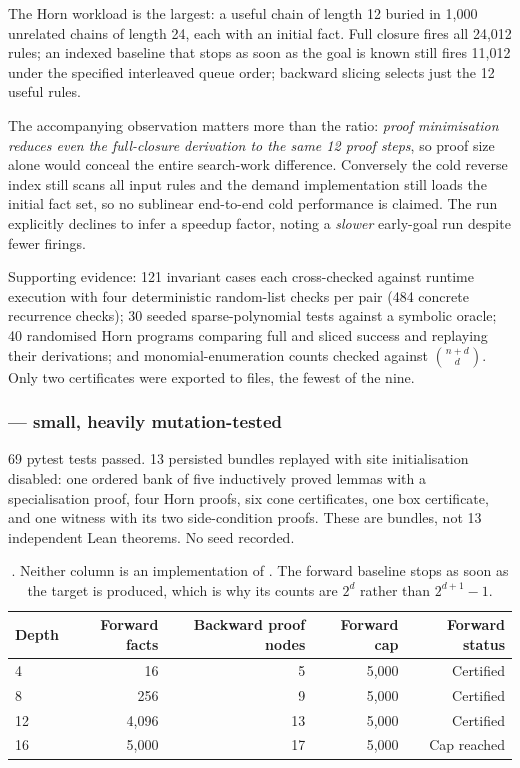 The Horn workload is the largest: a useful chain of length 12 buried in 1{,}000
unrelated chains of length 24, each with an initial fact. Full closure fires all
24{,}012 rules; an indexed baseline that stops as soon as the goal is known still
fires 11{,}012 under the specified interleaved queue order; backward slicing
selects just the 12 useful rules.

The accompanying observation matters more than the ratio: \emph{proof
minimisation reduces even the full-closure derivation to the same 12 proof
steps}, so proof size alone would conceal the entire search-work difference.
Conversely the cold reverse index still scans all input rules and the demand
implementation still loads the initial fact set, so no sublinear end-to-end cold
performance is claimed. The run explicitly declines to infer a speedup factor,
noting a \emph{slower} early-goal run despite fewer firings.

Supporting evidence: 121 invariant cases each cross-checked against runtime
execution with four deterministic random-list checks per pair (484 concrete
recurrence checks); 30 seeded sparse-polynomial tests against a symbolic oracle;
40 randomised Horn programs comparing full and sliced success and replaying
their derivations; and monomial-enumeration counts checked against
$\binom{n+d}{d}$. Only two certificates were exported to files, the fewest of
the nine.

\subsubsection*{ --- small, heavily mutation-tested}

69 pytest tests passed. 13 persisted bundles replayed with site initialisation
disabled: one ordered bank of five inductively proved lemmas with a
specialisation proof, four Horn proofs, six cone certificates, one box
certificate, and one witness with its two side-condition proofs. These are
bundles, not 13 independent Lean theorems. No seed recorded.

\begin{table}[htbp]
\centering\small
\begin{tabular}{@{}lrrrr@{}}
\toprule
Depth & Forward facts & Backward proof nodes & Forward cap & Forward status \\
\midrule
 4 &    16 &  5 & 5{,}000 & Certified \\
 8 &   256 &  9 & 5{,}000 & Certified \\
12 & 4{,}096 & 13 & 5{,}000 & Certified \\
16 & 5{,}000 & 17 & 5{,}000 & Cap reached \\
\bottomrule
\end{tabular}
\caption{. Neither column is an implementation of \grind{}. The forward
baseline stops as soon as the target is produced, which is why its counts are
$2^d$ rather than $2^{d+1}-1$.}
\label{tab:p9-horn}
\end{table}

